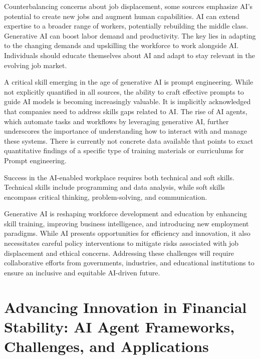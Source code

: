 \documentclass[a4paper,headinclude=on,footinclude=on,12pt,oneside]{scrbook}
\begin{document}

Counterbalancing concerns about job displacement, some sources emphasize AI’s potential to create new jobs and augment human capabilities. AI can extend expertise to a broader range of workers, potentially rebuilding the middle class. Generative AI can boost labor demand and productivity. The key lies in adapting to the changing demands and upskilling the workforce to work alongside AI. Individuals should educate themselves about AI and adapt to stay relevant in the evolving job market.


A critical skill emerging in the age of generative AI is prompt engineering. While not explicitly quantified in all sources, the ability to craft effective prompts to guide AI models is becoming increasingly valuable. It is implicitly acknowledged that companies need to address skills gaps related to AI. The rise of AI agents, which automate tasks and workflows by leveraging generative AI, further underscores the importance of understanding how to interact with and manage these systems. There is currently not concrete data available that points to exact quantitative findings of a specific type of training materials or curriculums for Prompt engineering.


Success in the AI-enabled workplace requires both technical and soft skills. Technical skills include programming and data analysis, while soft skills encompass critical thinking, problem-solving, and communication. 



Generative AI is reshaping workforce development and education by enhancing skill training, improving business intelligence, and introducing new employment paradigms. While AI presents opportunities for efficiency and innovation, it also necessitates careful policy interventions to mitigate risks associated with job displacement and ethical concerns. Addressing these challenges will require collaborative efforts from governments, industries, and educational institutions to ensure an inclusive and equitable AI-driven future.




\chapter{Advancing Innovation in Financial Stability: AI Agent Frameworks, Challenges, and Applications}
\end{document}
